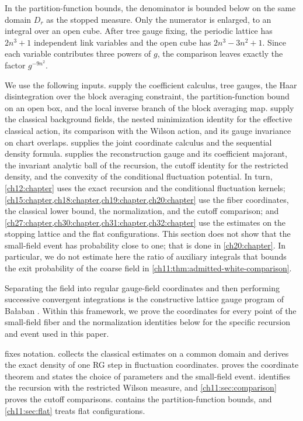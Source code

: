In the partition-function bounds, the denominator is bounded below on the same domain $D_r$ as the stopped measure. Only the numerator is enlarged, to an integral over an open cube. After tree gauge fixing, the periodic lattice has $2n^3+1$ independent link variables and the open cube has $2n^3-3n^2+1$. Since each variable contributes three powers of $g$, the comparison leaves exactly the factor $g^{-9n^2}$.

We use the following inputs.  supply the coefficient calculus, tree gauges, the Haar disintegration over the block averaging constraint, the partition-function bound on an open box, and the local inverse branch of the block averaging map.  supply the classical background fields, the nested minimization identity for the effective classical action, its comparison with the Wilson action, and its gauge invariance on chart overlaps.  supplies the joint coordinate calculus and the sequential density formula.  supplies the reconstruction gauge and its coefficient majorant, the invariant analytic ball of the recursion, the cutoff identity for the restricted density, and the convexity of the conditional fluctuation potential. In turn, \cref{ch12:chapter} uses the exact recursion and the conditional fluctuation kernels; \cref{ch15:chapter,ch18:chapter,ch19:chapter,ch20:chapter} use the fiber coordinates, the classical lower bound, the normalization, and the cutoff comparison; and \cref{ch27:chapter,ch30:chapter,ch31:chapter,ch32:chapter} use the estimates on the stopping lattice and the flat configurations. This section does not show that the small-field event has probability close to one; that is done in \cref{ch20:chapter}. In particular, we do not estimate here the ratio of auxiliary integrals that bounds the exit probability of the coarse field in \cref{ch11:thm:admitted-white-comparison}.

Separating the field into regular gauge-field coordinates and then performing successive convergent integrations is the constructive lattice gauge program of Ba\l aban \cite{Balaban1985Regular,Balaban1988Convergent}. Within this framework, we prove the coordinates for every point of the small-field fiber and the normalization identities below for the specific recursion and event used in this paper.

 fixes notation.  collects the classical estimates on a common domain and derives the exact density of one RG step in fluctuation coordinates.  proves the coordinate theorem and states the choice of parameters and the small-field event.  identifies the recursion with the restricted Wilson measure, and \cref{ch11:sec:comparison} proves the cutoff comparisons.  contains the partition-function bounds, and \cref{ch11:sec:flat} treats flat configurations.

